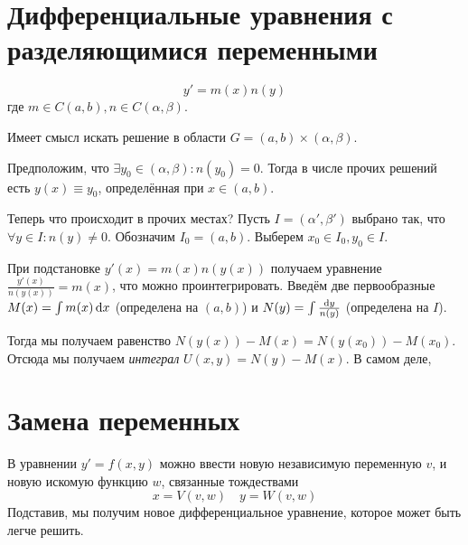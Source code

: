 \documentclass[a4paper]{report}
\begin{document}
    \section{Дифференциальные уравнения с разделяющимися переменными}
    \[y' = m(x)n(y)\]
    где $m \in C(a, b), n \in C(\alpha, \beta)$.

    Имеет смысл искать решение в области $G = (a, b) \times (\alpha, \beta)$.

    Предположим, что $\exists y_0 \in (\alpha, \beta): n(y_0) = 0$.
    Тогда в числе прочих решений есть $y(x) \equiv y_0$, определённая при $x \in (a, b)$.

    Теперь что происходит в прочих местах?
    Пусть $I = (\alpha', \beta')$ выбрано так, что $\forall y \in I: n(y) \ne 0$.
    Обозначим $I_0 = (a, b)$.
    Выберем $x_0 \in I_0, y_0 \in I$.

    При подстановке $y'(x) = m(x)n(y(x))$ получаем уравнение $\frac{y'(x)}{n(y(x))} = m(x)$, что можно проинтегрировать.
    Введём две первообразные $M(x) = \int\limits m(x)\operatorname{d}\! x$ (определена на $(a, b)$) и $N(y) = \int\limits \frac{\operatorname{d}\! y}{n(y)}$ (определена на $I$).

    Тогда мы получаем равенство $N(y(x)) - M(x) = N(y(x_0)) - M(x_0)$.
    Отсюда мы получаем \emph{интеграл} $U(x, y) = N(y) - M(x)$.
    В самом деле,


    \section{Замена переменных}
    В уравнении $y' = f(x, y)$ можно ввести новую независимую переменную $v$, и новую искомую функцию $w$, связанные тождествами
    \[x = V(v, w) \quad y = W(v, w)\]
    Подставив, мы получим новое дифференциальное уравнение, которое может быть легче решить.
\end{document}
